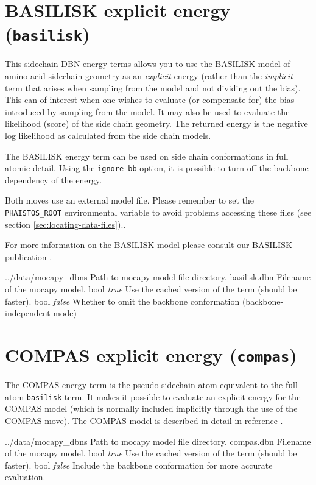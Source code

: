 
\section{BASILISK explicit energy (\texttt{basilisk})}
\label{sec:basilisk-energy}

This sidechain DBN energy terms allows you to use the BASILISK model
of amino acid sidechain geometry as an \emph{explicit} energy (rather
than the \emph{implicit} term that arises when sampling from the model
and not dividing out the bias). This can of interest when one wishes
to evaluate (or compensate for) the bias introduced by sampling from
the model. It may also be used to evaluate the likelihood (score) of
the side chain geometry. The returned energy is the negative log
likelihood as calculated from the side chain models.

The BASILISK energy term can be used on side chain conformations
in full atomic detail. Using the \texttt{ignore-bb} option, it is
possible to turn off the backbone dependency of the energy.

Both moves use an external model file. Please remember to set the
\texttt{PHAISTOS\_ROOT} environmental variable to avoid problems accessing
these files (see section \ref{sec:locating-data-files})..

For more information on the BASILISK model please consult our 
BASILISK publication \cite{harder2010beyond}.

\begin{optiontable}
   {../data/mocapy\_dbns} {Path to mocapy model file directory.}
   {basilisk.dbn} {Filename of the mocapy model.}
  	 {bool} {\emph{true}} 	{Use the cached version of the term (should be faster).}
  	 {bool} {\emph{false}} 	{Whether to omit the backbone conformation (backbone-independent mode)}
\end{optiontable}

\section{COMPAS explicit energy (\texttt{compas})}
\label{sec:compas-energy}

The COMPAS energy term is the pseudo-sidechain atom equivalent to the
full-atom \texttt{basilisk} term. It makes it possible to evaluate an
explicit energy for the COMPAS model (which is normally included
implicitly through the use of the COMPAS move). The COMPAS model is
described in detail in reference \cite{stovgaard2011}.

\begin{optiontable}
   {../data/mocapy\_dbns} {Path to mocapy model file directory.}
   {compas.dbn} {Filename of the mocapy model.}
  	 {bool} {\emph{true}} 	{Use the cached version of the term (should be faster).}
  	 {bool} {\emph{false}} 	{Include the backbone conformation for more accurate evaluation.}
\end{optiontable}


